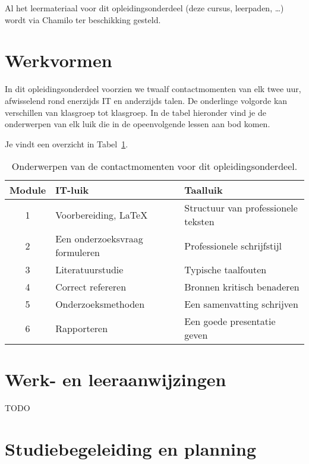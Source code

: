 Al het leermateriaal voor dit opleidingsonderdeel (deze cursus, leerpaden, \ldots) wordt via Chamilo ter beschikking gesteld.

\section{Werkvormen}
\label{sec:werkvormen}

In dit opleidingsonderdeel voorzien we twaalf contactmomenten van elk twee uur, afwisselend rond enerzijds IT en anderzijds talen. De onderlinge volgorde kan verschillen van klasgroep tot klasgroep. In de tabel hieronder vind je de onderwerpen van elk luik die in de opeenvolgende lessen aan bod komen.

Je vindt een overzicht in Tabel~\ref{tab:planning}.

\begin{table}
  \centering\begin{tabular}{cll}
    \toprule
    \textbf{Module} & \textbf{IT-luik}               & \textbf{Taalluik}                   \\
    \midrule
    1               & Voorbereiding, {\LaTeX}        & Structuur van professionele teksten \\
    2               & Een onderzoeksvraag formuleren & Professionele schrijfstijl          \\
    3               & Literatuurstudie               & Typische taalfouten                 \\
    4               & Correct refereren              & Bronnen kritisch benaderen          \\
    5               & Onderzoeksmethoden             & Een samenvatting schrijven          \\
    6               & Rapporteren                    & Een goede presentatie geven         \\
  \end{tabular}
  \caption{\label{tab:planning}Onderwerpen van de contactmomenten voor dit opleidingsonderdeel.}
\end{table}

\section{Werk- en leeraanwijzingen}
\label{sec:werk-en-leeraanwijzingen}

TODO

\section{Studiebegeleiding en planning}
\label{sec:studiebegeleiding-en-planning}

